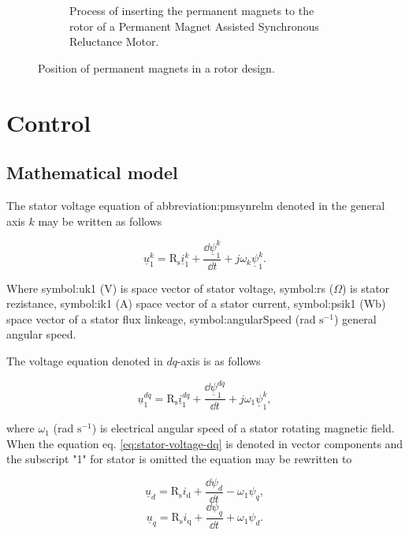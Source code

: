 \documentclass[a4paper, twoside, 11pt]{article}
\begin{document}
\begin{figure}[H]
\begin{subfigure}{0.4\textwidth}
            \caption{Process of inserting the permanent magnets to the rotor of a Permanent Magnet Assisted Synchronous Reluctance Motor. \cite{wang-synchronous-motors-for-traction-applications}}
            \label{fig:pm-inserted}
    \end{subfigure}
    \caption{Position of permanent magnets in a rotor design.}
\end{figure}

\FloatBarrier
\section{Control}

    \subsection{Mathematical model}
        The stator voltage equation of \gls{abbreviation:pmsynrelm} denoted in the general axis $k$ may be written as follows

        \begin{equation}
            \underline{u}^k_1 = \text{R}_\text{s} \underline{i}^k_1 + \frac{\dd \underline{\psi}^k_1 }{\dd t} + j \omega_k \underline{\psi}^k_1.
        \end{equation}

        Where \gls{symbol:uk1} (V) is space vector of stator voltage, \gls{symbol:rs} ($\Omega$) is stator rezistance, \gls{symbol:ik1} (A) space vector of a stator current, \gls{symbol:psik1} (Wb) space vector of a stator flux linkeage, \gls{symbol:angularSpeed} (rad $\text{s}^{-1}$) general angular speed.\par
        The voltage equation denoted in $dq$-axis is as follows

        \begin{equation}\label{eq:stator-voltage-dq}
            \underline{u}^{dq}_1 = \text{R}_\text{s} \underline{i}^{dq}_1 + \frac{\dd \underline{\psi}^{dq}_1 }{\dd t} + j \omega_1 \underline{\psi}^k_1,
        \end{equation}
        
        where $\omega_1$ (rad $\text{s}^{-1}$) is electrical angular speed of a stator rotating magnetic field. When the equation eq. \ref{eq:stator-voltage-dq} is denoted in vector components and the subscript "1" for stator is omitted the equation may be rewritten to

        \begin{equation}
            \underline{u}_d = \text{R}_\text{s} i_\text{d} + \frac{\dd \psi_d}{\dd t} - \omega_1\psi_q,
        \end{equation}
        \begin{equation}
            \underline{u}_q = \text{R}_\text{s} i_\text{q} + \frac{\dd \psi_q}{\dd t} + \omega_1\psi_d.
        \end{equation}
\end{document}
